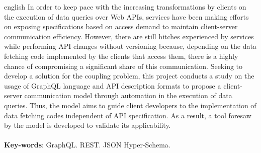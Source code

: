 \begin{resumo}[Abstract]
  \begin{otherlanguage*}{english}
    In order to keep pace with the increasing transformations by clients on the execution of data queries over Web APIs, services have been making efforts on exposing specifications based on access demand to maintain client-server communication efficiency. However, there are still hitches experienced by services while performing API changes without versioning because, depending on the data fetching code implemented by the clients that access them, there is a highly chance of compromising a significant share of this communication. Seeking to develop a solution for the coupling problem, this project conducts a study on the usage of GraphQL language and API description formats to propose a client-server communication model through automation in the execution of data queries. Thus, the model aims to guide client developers to the implementation of data fetching codes independent of API specification. As a result, a tool foresaw by the model is developed to validate its applicability. \\ \\
    \textbf{Key-words}: GraphQL. REST. JSON Hyper-Schema.
  \end{otherlanguage*}
\end{resumo}
